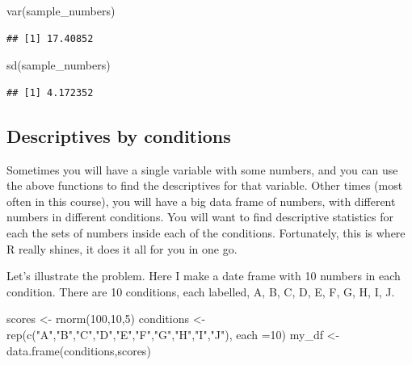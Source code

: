 \documentclass[
]{book}
\newenvironment{Shaded}{\begin{snugshade}}{\end{snugshade}}
\newcommand{\AttributeTok}[1]{\textcolor[rgb]{0.77,0.63,0.00}{#1}}
\newcommand{\DecValTok}[1]{\textcolor[rgb]{0.00,0.00,0.81}{#1}}
\newcommand{\FunctionTok}[1]{\textcolor[rgb]{0.00,0.00,0.00}{#1}}
\newcommand{\NormalTok}[1]{#1}
\newcommand{\OtherTok}[1]{\textcolor[rgb]{0.56,0.35,0.01}{#1}}
\newcommand{\StringTok}[1]{\textcolor[rgb]{0.31,0.60,0.02}{#1}}
\begin{document}
\begin{Shaded}
\begin{Highlighting}[]
\FunctionTok{var}\NormalTok{(sample\_numbers)}
\end{Highlighting}
\end{Shaded}

\begin{verbatim}
## [1] 17.40852
\end{verbatim}

\begin{Shaded}
\begin{Highlighting}[]
\FunctionTok{sd}\NormalTok{(sample\_numbers)}
\end{Highlighting}
\end{Shaded}

\begin{verbatim}
## [1] 4.172352
\end{verbatim}

\hypertarget{descriptives-by-conditions}{%
\subsection{Descriptives by conditions}\label{descriptives-by-conditions}}

Sometimes you will have a single variable with some numbers, and you can use the above functions to find the descriptives for that variable. Other times (most often in this course), you will have a big data frame of numbers, with different numbers in different conditions. You will want to find descriptive statistics for each the sets of numbers inside each of the conditions. Fortunately, this is where R really shines, it does it all for you in one go.

Let's illustrate the problem. Here I make a date frame with 10 numbers in each condition. There are 10 conditions, each labelled, A, B, C, D, E, F, G, H, I, J.

\begin{Shaded}
\begin{Highlighting}[]
\NormalTok{scores }\OtherTok{\textless{}{-}} \FunctionTok{rnorm}\NormalTok{(}\DecValTok{100}\NormalTok{,}\DecValTok{10}\NormalTok{,}\DecValTok{5}\NormalTok{)}
\NormalTok{conditions }\OtherTok{\textless{}{-}} \FunctionTok{rep}\NormalTok{(}\FunctionTok{c}\NormalTok{(}\StringTok{"A"}\NormalTok{,}\StringTok{"B"}\NormalTok{,}\StringTok{"C"}\NormalTok{,}\StringTok{"D"}\NormalTok{,}\StringTok{"E"}\NormalTok{,}\StringTok{"F"}\NormalTok{,}\StringTok{"G"}\NormalTok{,}\StringTok{"H"}\NormalTok{,}\StringTok{"I"}\NormalTok{,}\StringTok{"J"}\NormalTok{), }\AttributeTok{each =}\DecValTok{10}\NormalTok{)}
\NormalTok{my\_df }\OtherTok{\textless{}{-}} \FunctionTok{data.frame}\NormalTok{(conditions,scores)}
\end{Highlighting}
\end{Shaded}
\end{document}
